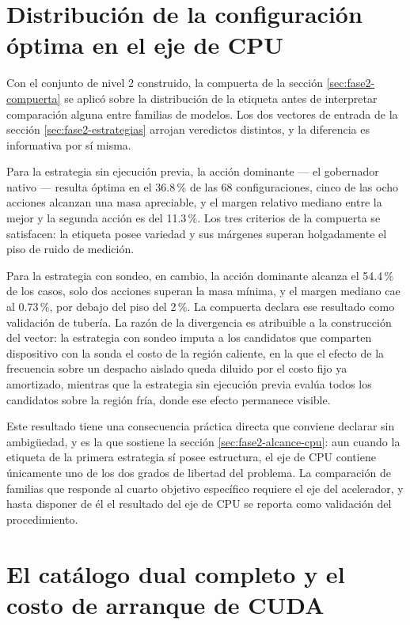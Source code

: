 \documentclass[12pt,oneside,spanish]{book}
\begin{document}
\section{Distribución de la configuración óptima en el eje de CPU}
\label{sec:resultados-compuerta}

Con el conjunto de nivel 2 construido, la compuerta de la sección \ref{sec:fase2-compuerta} se aplicó sobre la distribución de la etiqueta antes de interpretar comparación alguna entre familias de modelos. Los dos vectores de entrada de la sección \ref{sec:fase2-estrategias} arrojan veredictos distintos, y la diferencia es informativa por sí misma.

Para la estrategia sin ejecución previa, la acción dominante --- el gobernador nativo --- resulta óptima en el 36.8\,\% de las 68 configuraciones, cinco de las ocho acciones alcanzan una masa apreciable, y el margen relativo mediano entre la mejor y la segunda acción es del 11.3\,\%. Los tres criterios de la compuerta se satisfacen: la etiqueta posee variedad y sus márgenes superan holgadamente el piso de ruido de medición.

Para la estrategia con sondeo, en cambio, la acción dominante alcanza el 54.4\,\% de los casos, solo dos acciones superan la masa mínima, y el margen mediano cae al 0.73\,\%, por debajo del piso del 2\,\%. La compuerta declara ese resultado como validación de tubería. La razón de la divergencia es atribuible a la construcción del vector: la estrategia con sondeo imputa a los candidatos que comparten dispositivo con la sonda el costo de la región caliente, en la que el efecto de la frecuencia sobre un despacho aislado queda diluido por el costo fijo ya amortizado, mientras que la estrategia sin ejecución previa evalúa todos los candidatos sobre la región fría, donde ese efecto permanece visible.

Este resultado tiene una consecuencia práctica directa que conviene declarar sin ambigüedad, y es la que sostiene la sección \ref{sec:fase2-alcance-cpu}: aun cuando la etiqueta de la primera estrategia sí posee estructura, el eje de CPU contiene únicamente uno de los dos grados de libertad del problema. La comparación de familias que responde al cuarto objetivo específico requiere el eje del acelerador, y hasta disponer de él el resultado del eje de CPU se reporta como validación del procedimiento.

\section{El catálogo dual completo y el costo de arranque de CUDA}
\label{sec:resultados-compuerta-dual}
\end{document}
